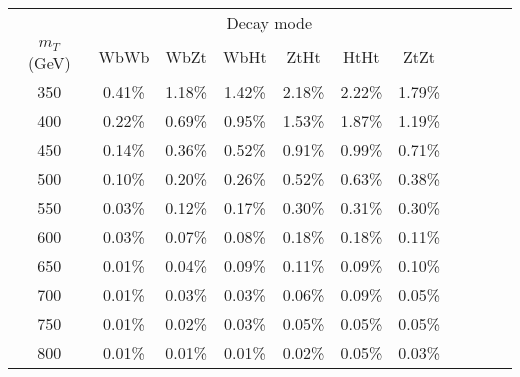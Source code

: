 \begin{tabular}{c c c c c c c c c c c } \toprule
 & \multicolumn{6}{c}{ Decay mode } \\
 $m_{T}$ (GeV)  & WbWb 		 & WbZt 		 & WbHt 		 & ZtHt 		 & HtHt 		 & ZtZt 		 \\ \midrule 
 350 & 0.41\% & 1.18\% & 1.42\% & 2.18\% & 2.22\% & 1.79\%\\ 
400 & 0.22\% & 0.69\% & 0.95\% & 1.53\% & 1.87\% & 1.19\%\\ 
450 & 0.14\% & 0.36\% & 0.52\% & 0.91\% & 0.99\% & 0.71\%\\ 
500 & 0.10\% & 0.20\% & 0.26\% & 0.52\% & 0.63\% & 0.38\%\\ 
550 & 0.03\% & 0.12\% & 0.17\% & 0.30\% & 0.31\% & 0.30\%\\ 
600 & 0.03\% & 0.07\% & 0.08\% & 0.18\% & 0.18\% & 0.11\%\\ 
650 & 0.01\% & 0.04\% & 0.09\% & 0.11\% & 0.09\% & 0.10\%\\ 
700 & 0.01\% & 0.03\% & 0.03\% & 0.06\% & 0.09\% & 0.05\%\\ 
750 & 0.01\% & 0.02\% & 0.03\% & 0.05\% & 0.05\% & 0.05\%\\ 
800 & 0.01\% & 0.01\% & 0.01\% & 0.02\% & 0.05\% & 0.03\%\\ 
\bottomrule\end{tabular}